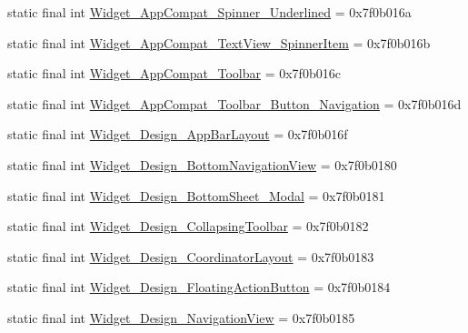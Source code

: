 \begin{CompactItemize}
\item 
static final int \hyperlink{classandroid_1_1support_1_1graphics_1_1drawable_1_1animated_1_1_r_1_1style_f1bc91eb0bb2e20f49d8080ff3a352de}{Widget\_\-AppCompat\_\-Spinner\_\-Underlined} = 0x7f0b016a
\item 
static final int \hyperlink{classandroid_1_1support_1_1graphics_1_1drawable_1_1animated_1_1_r_1_1style_0bcaef93103aa500654a6d6faa90e5be}{Widget\_\-AppCompat\_\-TextView\_\-SpinnerItem} = 0x7f0b016b
\item 
static final int \hyperlink{classandroid_1_1support_1_1graphics_1_1drawable_1_1animated_1_1_r_1_1style_e674738378b11d710618b51bf924e2d3}{Widget\_\-AppCompat\_\-Toolbar} = 0x7f0b016c
\item 
static final int \hyperlink{classandroid_1_1support_1_1graphics_1_1drawable_1_1animated_1_1_r_1_1style_1b5cd712b99abd4bec56d6f65f84d587}{Widget\_\-AppCompat\_\-Toolbar\_\-Button\_\-Navigation} = 0x7f0b016d
\item 
static final int \hyperlink{classandroid_1_1support_1_1graphics_1_1drawable_1_1animated_1_1_r_1_1style_0e556faa80dcc3601569b2581e2f52fd}{Widget\_\-Design\_\-AppBarLayout} = 0x7f0b016f
\item 
static final int \hyperlink{classandroid_1_1support_1_1graphics_1_1drawable_1_1animated_1_1_r_1_1style_8568c5b14638036ce3d71012db7afc9a}{Widget\_\-Design\_\-BottomNavigationView} = 0x7f0b0180
\item 
static final int \hyperlink{classandroid_1_1support_1_1graphics_1_1drawable_1_1animated_1_1_r_1_1style_46998de66e45c36c4bf72830e59dd2df}{Widget\_\-Design\_\-BottomSheet\_\-Modal} = 0x7f0b0181
\item 
static final int \hyperlink{classandroid_1_1support_1_1graphics_1_1drawable_1_1animated_1_1_r_1_1style_ef5d999240e52fbedf958f31ad6db75a}{Widget\_\-Design\_\-CollapsingToolbar} = 0x7f0b0182
\item 
static final int \hyperlink{classandroid_1_1support_1_1graphics_1_1drawable_1_1animated_1_1_r_1_1style_ea5582e38adcfe9eda29bbbd4e6e44e8}{Widget\_\-Design\_\-CoordinatorLayout} = 0x7f0b0183
\item 
static final int \hyperlink{classandroid_1_1support_1_1graphics_1_1drawable_1_1animated_1_1_r_1_1style_7585e24b5c72f777ee1189af9c7c2403}{Widget\_\-Design\_\-FloatingActionButton} = 0x7f0b0184
\item 
static final int \hyperlink{classandroid_1_1support_1_1graphics_1_1drawable_1_1animated_1_1_r_1_1style_d67d52f48fa13571b3c8407841a1c19e}{Widget\_\-Design\_\-NavigationView} = 0x7f0b0185

\end{CompactItemize}
